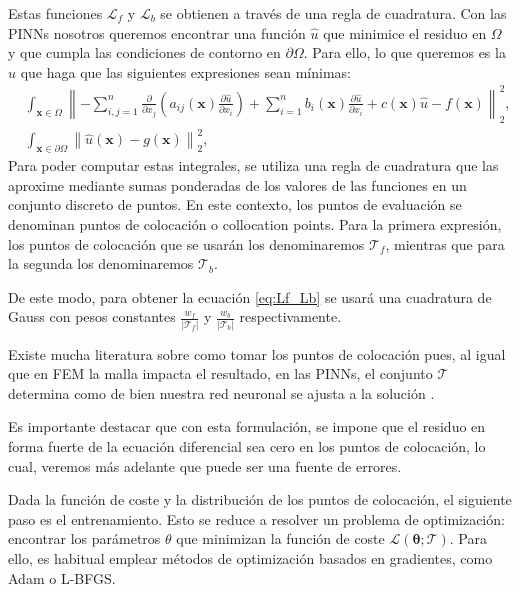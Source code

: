 \documentclass[a4paper,11pt,spanish, twoside, leqno]{tfg-uam}
\theoremstyle{definition}
\begin{document}
Estas funciones $\mathcal{L}_f$ y $\mathcal{L}_b$ se obtienen a través de una regla de cuadratura. Con las PINNs nosotros queremos encontrar una función $\hat{u}$ que minimice el residuo en $\Omega$ y que cumpla las condiciones de contorno en $\partial\Omega$. Para ello, lo que queremos es la $\hat{u}$ que haga que las siguientes expresiones sean mínimas:
\begin{align*}
    &\int_{\mathbf{x} \in \Omega} \left\| -\sum_{i,j=1}^{n} \frac{\partial}{\partial x_j}\left( a_{ij}(\mathbf{x})\frac{\partial \hat{u}}{\partial x_i}\right) + \sum_{i=1}^{n} b_i(\mathbf{x})\frac{\partial \hat{u}}{\partial x_i} + c(\mathbf{x})\hat{u} - f(\mathbf{x}) \right\|_2^2, \\ 
    &\int_{\mathbf{x} \in \partial\Omega} \left\| \hat{u} (\mathbf{x}) - g(\mathbf{x})\right\|_2^2,
\end{align*}
Para poder computar estas integrales, se utiliza una regla de cuadratura que las aproxime mediante sumas ponderadas de los valores de las funciones en un conjunto discreto de puntos. En este contexto, los puntos de evaluación se denominan puntos de colocación o collocation points. Para la primera expresión, los puntos de colocación que se usarán los denominaremos $\mathcal{T}_f$, mientras que para la segunda los denominaremos $\mathcal{T}_b$. 

De este modo, para obtener la ecuación \eqref{eq:Lf_Lb} se usará una cuadratura de Gauss con pesos constantes $\frac{w_f}{|\mathcal{T}_f|}$ y $\frac{w_b}{|\mathcal{T}_b|}$ respectivamente. 

Existe mucha literatura sobre como tomar los puntos de colocación pues, al igual que en FEM la malla impacta el resultado, en las PINNs, el conjunto $\mathcal{T}$ determina como de bien nuestra red neuronal se ajusta a la solución \cite{münzer2022curriculumtrainingbasedstrategydistributingcollocation}\cite{aikawa2024improving}\cite{matsubara2023goodlatticetrainingphysicsinformed}\cite{subramanian2022adaptiveselfsupervisionalgorithmsphysicsinformed}\cite{hou2023enhancing}.  

Es importante destacar que con esta formulación, se impone que el residuo en forma fuerte de la ecuación diferencial sea cero en los puntos de colocación, lo cual, veremos más adelante que puede ser una fuente de errores. 

Dada la función de coste y la distribución de los puntos de colocación, el siguiente paso es el entrenamiento. Esto se reduce a resolver un problema de optimización: encontrar los parámetros $\theta$ que minimizan la función de coste $\mathcal{L}(\boldsymbol{\theta}; \mathcal{T})$. Para ello, es habitual emplear métodos de optimización basados en gradientes, como Adam o L-BFGS. 
\end{document}
